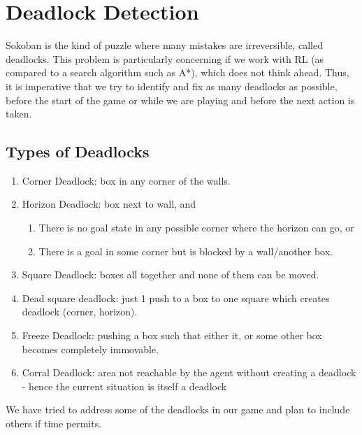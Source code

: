 \documentclass{article}
\begin{document}
\section{Deadlock Detection}

Sokoban is the kind of puzzle where many mistakes are irreversible, called deadlocks. This problem is particularly concerning if we work with RL (as compared to a search algorithm such as A*), which does not think ahead. Thus, it is imperative that we try to identify and fix as many deadlocks as possible, before the start of the game or while we are playing and before the next action is taken.  

\subsection{Types of Deadlocks}
\begin{enumerate}
    \item Corner Deadlock: box in any corner of the walls.
    \item Horizon Deadlock: box next to wall, and 
    \begin{enumerate}[label=\alph*)]
        \item There is no goal state in any possible corner where the horizon can go, or
        \item There is a goal in some corner but is blocked by a wall/another box.
    \end{enumerate}
    \item Square Deadlock: boxes all together and none of them can be moved.
    \item Dead square deadlock: just 1 push to a box to one square which creates deadlock (corner, horizon).
    \item Freeze Deadlock: pushing a box such that either it, or some other box becomes completely immovable.
    \item Corral Deadlock: area not reachable by the agent without creating a deadlock - hence the current situation is itself a deadlock
\end{enumerate}

We have tried to address some of the deadlocks in our game and plan to include others if time permits. 
\end{document}
